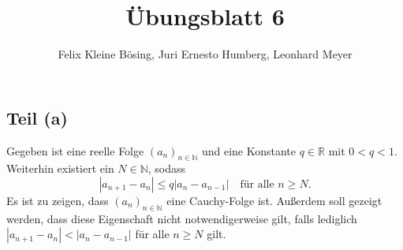 \documentclass[11pt]{article}
\begin{document}
\title{Übungsblatt 6}
\author{Felix Kleine Bösing, Juri Ernesto Humberg, Leonhard Meyer}
\maketitle
\newpage

\subsection*{Teil (a)}
Gegeben ist eine reelle Folge $(a_n)_{n \in \mathbb{N}}$ und eine Konstante $q \in \mathbb{R}$ mit $0 < q < 1$. Weiterhin existiert ein $N \in \mathbb{N}$, sodass
\[
|a_{n+1} - a_n| \leq q |a_n - a_{n-1}| \quad \text{für alle } n \geq N.
\]
Es ist zu zeigen, dass $(a_n)_{n \in \mathbb{N}}$ eine Cauchy-Folge ist. Außerdem soll gezeigt werden, dass diese Eigenschaft nicht notwendigerweise gilt, falls lediglich $|a_{n+1} - a_n| < |a_n - a_{n-1}|$ für alle $n \geq N$ gilt.
\end{document}
